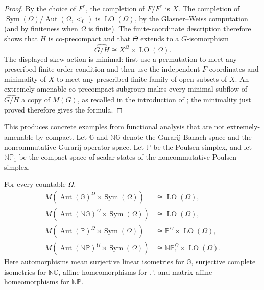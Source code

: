 \begin{proof}
By the choice of \(F^*\), the completion of \(F/F^*\) is \(X\). The completion
of \(\operatorname{Sym}(\Omega)/\operatorname{Aut}(\Omega,<_0)\) is
\(\operatorname{LO}(\Omega)\), by the Glasner--Weiss computation (and by
finiteness when \(\Omega\) is finite). The finite-coordinate description
therefore shows that \(H\) is co-precompact and that \(\Theta\) extends to a
\(G\)-isomorphism
\[
 \widehat{G/H}\cong X^\Omega\times\operatorname{LO}(\Omega).
\]
The displayed skew action is minimal: first use a permutation to meet any
prescribed finite order condition and then use the independent \(F\)-coordinates
and minimality of \(X\) to meet any prescribed finite family of open subsets of
\(X\). An extremely amenable co-precompact subgroup makes every minimal
subflow of \(\widehat{G/H}\) a copy of \(M(G)\), as recalled in the introduction
of \cite{BYMT2017}; the minimality just proved therefore gives the formula.
\end{proof}

This produces concrete examples from functional analysis that are not
extremely-amenable-by-compact.  Let \(\mathbb G\) and \(\mathbb{NG}\) denote
the Gurarij Banach space and the noncommutative Gurarij operator space.  Let
\(\mathbb P\) be the Poulsen simplex, and let \(\mathbb{NP}_1\) be the compact
space of scalar states of the noncommutative Poulsen simplex.

\begin{corollary}\label{cor:pw-gurarij-poulsen-wreath-umf}
For every countable \(\Omega\),
\begin{align*}
 M\!\left(\operatorname{Aut}(\mathbb G)^\Omega
          \rtimes\operatorname{Sym}(\Omega)\right)
 &\cong\operatorname{LO}(\Omega),\\
 M\!\left(\operatorname{Aut}(\mathbb{NG})^\Omega
          \rtimes\operatorname{Sym}(\Omega)\right)
 &\cong\operatorname{LO}(\Omega),\\
 M\!\left(\operatorname{Aut}(\mathbb P)^\Omega
          \rtimes\operatorname{Sym}(\Omega)\right)
 &\cong\mathbb P^\Omega\times\operatorname{LO}(\Omega),\\
 M\!\left(\operatorname{Aut}(\mathbb{NP})^\Omega
          \rtimes\operatorname{Sym}(\Omega)\right)
 &\cong\mathbb{NP}_1^\Omega\times\operatorname{LO}(\Omega).
\end{align*}
Here automorphisms mean surjective linear isometries for \(\mathbb G\),
surjective complete isometries for \(\mathbb{NG}\), affine homeomorphisms for
\(\mathbb P\), and matrix-affine homeomorphisms for \(\mathbb{NP}\).
\end{corollary}

